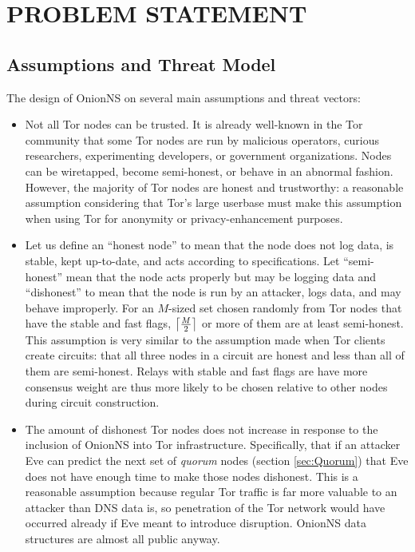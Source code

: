 
\chapter{PROBLEM STATEMENT}

\section{Assumptions and Threat Model}
\label{sec:Assumptions}

The design of OnionNS on several main assumptions and threat vectors:

\begin{itemize}
  \item Not all Tor nodes can be trusted. It is already well-known in the Tor community that some Tor nodes are run by malicious operators, curious researchers, experimenting developers, or government organizations. Nodes can be wiretapped, become semi-honest, or behave in an abnormal fashion. However, the majority of Tor nodes are honest and trustworthy: a reasonable assumption considering that Tor's large userbase must make this assumption when using Tor for anonymity or privacy-enhancement purposes.
  \item Let us define an ``honest node'' to mean that the node does not log data, is stable, kept up-to-date, and acts according to specifications. Let ``semi-honest'' mean that the node acts properly but may be logging data and ``dishonest'' to mean that the node is run by an attacker, logs data, and may behave improperly. For an $ M $-sized set chosen randomly from Tor nodes that have the stable and fast flags, $ \ceil[\big]{\frac{M}{2}} $ or more of them are at least semi-honest. This assumption is very similar to the assumption made when Tor clients create circuits: that all three nodes in a circuit are honest and less than all of them are semi-honest. Relays with stable and fast flags are have more consensus weight are thus more likely to be chosen relative to other nodes during circuit construction.
  \item The amount of dishonest Tor nodes does not increase in response to the inclusion of OnionNS into Tor infrastructure. Specifically, that if an attacker Eve can predict the next set of \emph{quorum} nodes (section \ref{sec:Quorum}) that Eve does not have enough time to make those nodes dishonest. This is a reasonable assumption because regular Tor traffic is far more valuable to an attacker than DNS data is, so penetration of the Tor network would have occurred already if Eve meant to introduce disruption. OnionNS data structures are almost all public anyway.

\end{itemize}
